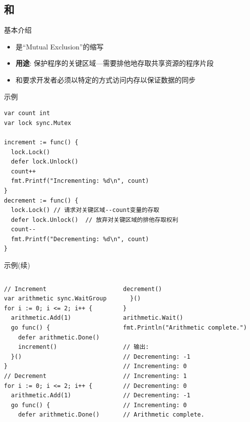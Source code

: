 \subsection{\Mutex 和\RWMutex }
\begin{frame}{基本介绍}
    \begin{itemize}
        \item \Mutex 是``Mutual Exclusion''的缩写
        \item \textbf{用途}: 保护程序的\alert{关键区域}---需要排他地存取共享资源的程序片段
        \item \Mutex 和\RWMutex 要求开发者必须以\alert{特定的方式}访问内存以保证数据的同步
    \end{itemize}
\end{frame}

\begin{frame}[fragile]{示例}
\begin{lstlisting}[caption={\Mutex 使用示例}]
var count int
var lock sync.Mutex

increment := func() {
  lock.Lock()
  defer lock.Unlock()
  count++
  fmt.Printf("Incrementing: %d\n", count)
}
decrement := func() {
  lock.Lock() // 请求对关键区域--count变量的存取
  defer lock.Unlock()  // 放弃对关键区域的排他存取权利
  count--
  fmt.Printf("Decrementing: %d\n", count)
}
\end{lstlisting}
\end{frame}

\begin{frame}[fragile]{示例(续)}
    \begin{columns}[t]
        \begin{column}{0.5\textwidth}
\begin{lstlisting}[caption={\Mutex 使用示例(续)},firstnumber=last,xleftmargin=8pt]
// Increment
var arithmetic sync.WaitGroup
for i := 0; i <= 2; i++ {
  arithmetic.Add(1)
  go func() {
    defer arithmetic.Done()
    increment()
  }()
}
// Decrement
for i := 0; i <= 2; i++ {
  arithmetic.Add(1)
  go func() {
    defer arithmetic.Done()
\end{lstlisting}
        \end{column}
        \begin{column}{0.5\textwidth}
\begin{lstlisting}[caption={\Mutex 使用示例(续)},firstnumber=last,xleftmargin=8pt]
    decrement()
  }()
}
arithmetic.Wait()
fmt.Println("Arithmetic complete.")

// 输出:
// Decrementing: -1
// Incrementing: 0
// Incrementing: 1
// Decrementing: 0
// Decrementing: -1
// Incrementing: 0
// Arithmetic complete.
\end{lstlisting}
        \end{column}
    \end{columns}
\end{frame}

